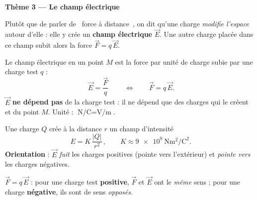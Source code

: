 \documentclass[11pt,a4paper]{article}
\newcommand{\vv}[1]{\vec{#1}}\newcommand{\ds}{\displaystyle}
\begin{document}

\begin{center}\large\bfseries\color{primarydark}
Thème 3 — Le champ électrique
\end{center}

Plutôt que de parler de \guillemotleft~force à distance~\guillemotright, on dit qu'une charge
\emph{modifie l'espace} autour d'elle : elle y crée un \textbf{champ électrique} $\vv{E}$. Une autre
charge placée dans ce champ subit alors la force $\vv{F} = q\,\vv{E}$.

\begin{cle}
Le champ électrique en un point $M$ est la force par unité de charge subie par une charge test $q$ :
\[ \boxed{\;\vv{E} = \dfrac{\vv{F}}{q}\;}\qquad\Longleftrightarrow\qquad \vv{F} = q\,\vv{E}. \]
$\vv{E}$ \textbf{ne dépend pas} de la charge test : il ne dépend que des charges qui le créent et du
point $M$. Unité : $\si{\newton\per\coulomb} = \si{\volt\per\metre}$.
\end{cle}

\begin{cle}
Une charge $Q$ crée à la distance $r$ un champ d'intensité
\[ \boxed{\,E = K\,\dfrac{|Q|}{r^{2}}\,},\qquad K \approx \num{9e9}\ \si{\newton\metre\squared\per\coulomb\squared}. \]
\textbf{Orientation} : $\vv{E}$ \emph{fuit} les charges positives (pointe vers l'extérieur) et
\emph{pointe vers} les charges négatives.
\end{cle}

\begin{center}
\end{center}

\begin{cle}
$\vv{F} = q\,\vv{E}$ : pour une charge test \textbf{positive}, $\vv{F}$ et $\vv{E}$ ont le
\emph{même} sens ; pour une charge \textbf{négative}, ils sont de sens \emph{opposés}.
\end{cle}
\end{document}
